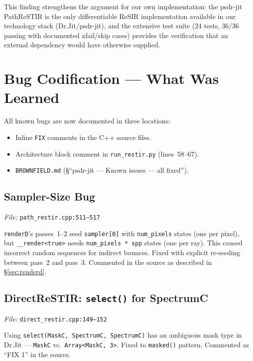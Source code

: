 This finding strengthens the argument for our own implementation: the psdr-jit
PathReSTIR is the only differentiable ReSIR implementation available in our
technology stack (Dr.Jit/psdr-jit), and the extensive test suite (24 tests,
36/36 passing with documented xfail/skip cases) provides the verification that
an external dependency would have otherwise supplied.

\section{Bug Codification --- What Was Learned}
\label{sec:bugs}

All known bugs are now documented in three locations:
\begin{itemize}
    \item Inline \texttt{FIX} comments in the C++ source files.
    \item Architecture block comment in \texttt{run\_restir.py} (lines~58--67).
    \item \texttt{BROWNFIELD.md} (\S ``psdr-jit --- Known issues --- all fixed'').
\end{itemize}

\subsection{Sampler-Size Bug}
\label{sec:samplerbug}

\emph{File:} \texttt{path\_restir.cpp:511--517}

\texttt{renderD}'s passes~1--2 seed \texttt{sampler[0]} with
\texttt{num\_pixels} states (one per pixel), but \texttt{\_\_render<true>}
needs \texttt{num\_pixels * spp} states (one per ray). This caused
incorrect random sequences for indirect bounces. Fixed with explicit
re-seeding between pass~2 and pass~3. Commented in the source as described
in \S\ref{sec:renderd}.

\subsection{DirectReSTIR: \texttt{select()} for SpectrumC}
\label{sec:selectbug}

\emph{File:} \texttt{direct\_restir.cpp:149--152}

Using \texttt{select(MaskC, SpectrumC, SpectrumC)} has an ambiguous mask
type in Dr.Jit --- \texttt{MaskC} vs.\ \texttt{Array<MaskC, 3>}. Fixed to
\texttt{masked()} pattern. Commented as ``FIX 1'' in the source.

